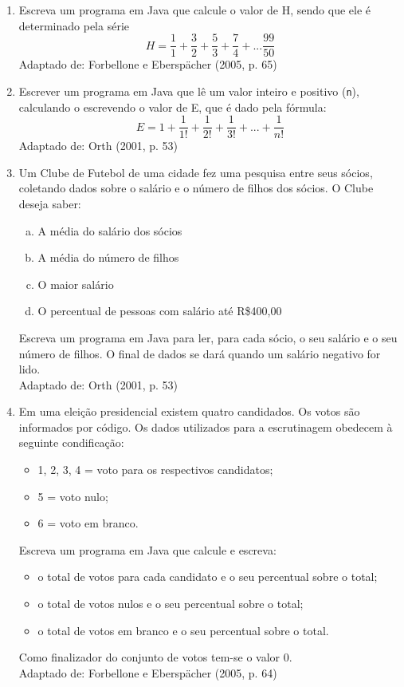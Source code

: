 \documentclass[onecolumn,a4paper,10pt]{report}
\newcommand{\+}{\, + \,}
\newcommand{\<}{\hspace*{-0.4cm}}
\begin{document}
\begin{enumerate}[1.]
\item Escreva um programa em Java que calcule o valor de H, sendo que ele é determinado pela série
\[ H = \frac{1}{1} + \frac{3}{2} + \frac{5}{3} + \frac{7}{4} + ... \frac{99}{50} \]
{\tiny Adaptado de: Forbellone e Eberspächer (2005, p. 65)}

\item Escrever um programa em Java que lê um valor inteiro e positivo (\texttt{n}), calculando o escrevendo o valor de E, que é dado pela fórmula:
\[ E = 1 + \frac{1}{1!} + \frac{1}{2!}+ \frac{1}{3!} + ... + \frac{1}{n!}\]
{\tiny Adaptado de: Orth (2001, p. 53)}

\item Um Clube de Futebol de uma cidade fez uma pesquisa entre seus sócios, coletando dados sobre o salário e o número de filhos dos sócios. O Clube deseja saber:
\begin{enumerate}[a)]
	\item A média do salário dos sócios
	\item A média do número de filhos
	\item O maior salário
	\item O percentual de pessoas com salário até R\$400,00
\end{enumerate}
Escreva um programa em Java para ler, para cada sócio, o seu salário e o seu número de filhos. O final de dados se dará quando um salário negativo for lido.\\
{\tiny Adaptado de: Orth (2001, p. 53)}

\item Em uma eleição presidencial existem quatro candidados. Os votos são informados por código. Os dados utilizados para a escrutinagem obedecem à seguinte condificação:
\begin{itemize}
	\item 1, 2, 3, 4 = voto para os respectivos candidatos;
	\item 5 = voto nulo;
	\item 6 = voto em branco.
\end{itemize}
Escreva um programa em Java que calcule e escreva:
\begin{itemize}
	\item o total de votos para cada candidato e o seu percentual sobre o total;
	\item o total de votos nulos e o seu percentual sobre o total;
	\item o total de votos em branco e o seu percentual sobre o total.
\end{itemize}
Como finalizador do conjunto de votos tem-se o valor 0.\\
{\tiny Adaptado de: Forbellone e Eberspächer (2005, p. 64)}


\end{enumerate}
\end{document}
